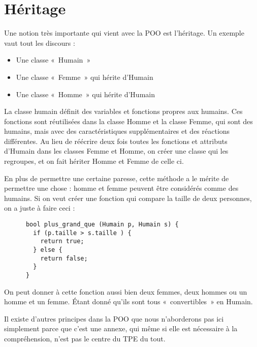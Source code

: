   \section{Héritage}
    Une notion très importante qui vient avec la POO est l'héritage. Un exemple vaut tout les discours :
      \begin{itemize}
        \item Une classe «~Humain~»
        \item Une classe «~Femme~» qui hérite d'Humain
        \item Une classe «~Homme~» qui hérite d'Humain
      \end{itemize}
    
    La classe humain définit des variables et fonctions propres aux humains. Ces fonctions sont réutilisées dans la classe Homme et la classe Femme, qui sont des humains, mais avec des caractéristiques supplémentaires et des réactions différentes. Au lieu de réécrire deux fois toutes les fonctions et attributs d'Humain dans les classes Femme et Homme, on créer une classe qui les regroupes, et on fait hériter Homme et Femme de celle ci.
    
    En plus de permettre une certaine paresse, cette méthode a le mérite de permettre une chose : homme et femme peuvent être considérés comme des humains. Si on veut créer une fonction qui compare la taille de deux 
    personnes, on a juste à faire ceci :
    \begin{lstlisting}
      bool plus_grand_que (Humain p, Humain s) {
        if (p.taille > s.taille ) {
          return true;
        } else {
          return false;
        }
      }
    \end{lstlisting}
    
    On peut donner à cette fonction aussi bien deux femmes, deux hommes ou un homme et un femme. Étant donné qu'ils sont tous «~convertibles~» en Humain.
    
    Il existe d'autres principes dans la POO que nous n'aborderons pas ici simplement parce que c'est une annexe, qui même si elle est nécessaire à la compréhension, n'est pas le centre du TPE du tout.

